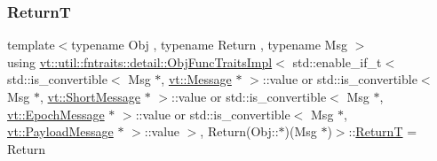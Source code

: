 \subsubsection{\texorpdfstring{ReturnT}{ReturnT}}
{\footnotesize\ttfamily template$<$typename Obj , typename Return , typename Msg $>$ \\
using \hyperlink{structvt_1_1util_1_1fntraits_1_1detail_1_1_obj_func_traits_impl}{vt\+::util\+::fntraits\+::detail\+::\+Obj\+Func\+Traits\+Impl}$<$ std\+::enable\+\_\+if\+\_\+t$<$ std\+::is\+\_\+convertible$<$ Msg $\ast$, \hyperlink{namespacevt_a3a3ddfef40b4c90915fa43cdd5f129ea}{vt\+::\+Message} $\ast$ $>$\+::value or std\+::is\+\_\+convertible$<$ Msg $\ast$, \hyperlink{namespacevt_a1125ac1da6c0bbf141e0ea0739d7602d}{vt\+::\+Short\+Message} $\ast$ $>$\+::value or std\+::is\+\_\+convertible$<$ Msg $\ast$, \hyperlink{namespacevt_ad67368ffae52d7325002586b41bb150e}{vt\+::\+Epoch\+Message} $\ast$ $>$\+::value or std\+::is\+\_\+convertible$<$ Msg $\ast$, \hyperlink{namespacevt_a89a92229c5622b855c02c549f83a1a68}{vt\+::\+Payload\+Message} $\ast$ $>$\+::value $>$, Return(Obj\+::$\ast$)(Msg $\ast$)$>$\+::\hyperlink{structvt_1_1util_1_1fntraits_1_1detail_1_1_obj_func_traits_impl_3_01std_1_1enable__if__t_3_01stdc67616d674616ce71c363c0e039ceb56_addb327d4046476d87f16855428fd5726}{ReturnT} =  Return}


